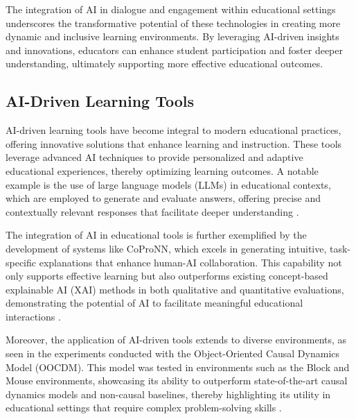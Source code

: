 The integration of AI in dialogue and engagement within educational settings underscores the transformative potential of these technologies in creating more dynamic and inclusive learning environments. By leveraging AI-driven insights and innovations, educators can enhance student participation and foster deeper understanding, ultimately supporting more effective educational outcomes.



\subsection{AI-Driven Learning Tools} \label{subsec:AI-Driven Learning Tools}



AI-driven learning tools have become integral to modern educational practices, offering innovative solutions that enhance learning and instruction. These tools leverage advanced AI techniques to provide personalized and adaptive educational experiences, thereby optimizing learning outcomes. A notable example is the use of large language models (LLMs) in educational contexts, which are employed to generate and evaluate answers, offering precise and contextually relevant responses that facilitate deeper understanding \cite{oh2024generativeaiparadoxevaluation}.



The integration of AI in educational tools is further exemplified by the development of systems like CoProNN, which excels in generating intuitive, task-specific explanations that enhance human-AI collaboration. This capability not only supports effective learning but also outperforms existing concept-based explainable AI (XAI) methods in both qualitative and quantitative evaluations, demonstrating the potential of AI to facilitate meaningful educational interactions \cite{chiaburu2024copronnconceptbasedprototypicalnearest}.



Moreover, the application of AI-driven tools extends to diverse environments, as seen in the experiments conducted with the Object-Oriented Causal Dynamics Model (OOCDM). This model was tested in environments such as the Block and Mouse environments, showcasing its ability to outperform state-of-the-art causal dynamics models and non-causal baselines, thereby highlighting its utility in educational settings that require complex problem-solving skills \cite{yu2024learningcausaldynamicsmodels}.



